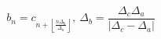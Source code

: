 \documentclass{article}
\begin{document}
\begin{titlepage}


\begin{equation*}
b_{n} = c_{n+\left\lfloor \frac{n\Delta _{b}}{\Delta _{a}}\right\rfloor},\ \Delta _{b}=\frac{\Delta _{c}\Delta _{a}}{\left\vert \Delta _{c}-\Delta_{a}\right\vert } 
\end{equation*}


\end{titlepage}
\end{document}
